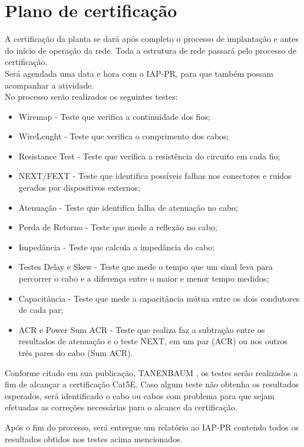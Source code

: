 \documentclass[	DIV=calc,%
							paper=a4,%
							fontsize=12pt,%
							onecolumn]{scrartcl}	 					%
\begin{document}
\section{Plano de certificação}
A certificação da planta se dará após completo o processo de implantação e antes do início de operação da rede. Toda a estrutura de rede passará pelo processo de certificação.\\
Será agendada uma data e hora com o IAP-PR, para que também possam acompanhar a atividade.\\
No processo serão realizados os seguintes testes:
\begin{itemize}
\vspace{5mm}
\item Wiremap - Teste que verifica a continuidade dos fios;
\item WireLenght - Teste que verifica o comprimento dos cabos;
\item Resistance Test - Teste que verifica a resistência do circuito em cada fio;
\item NEXT/FEXT - Teste que identifica possíveis falhas nos conectores e ruídos gerados por dispositivos externos;
\item Atenuação - Teste que identifica falha de atenuação no cabo;
\item Perda de Retorno - Teste que mede a reflexão no cabo;
\item Impedância - Teste que calcula a impedância do cabo;
\item Testes Delay e Skew - Teste que mede o tempo que um sinal leva para percorrer o cabo e a diferença entre o maior e menor tempo medidos;
\item Capacitância - Teste que mede a capacitância mútua entre os dois condutores de cada par;
\item ACR e Power Sum ACR - Teste que realiza faz a subtração entre os resultados de atenuação e o teste NEXT, em um par (ACR) ou nos outros três pares do cabo (Sum ACR).
\end{itemize}
\par Conforme citado em sua publicação, TANENBAUM \cite{TANENBAUM}, os testes serão realizados a fim de alcançar a certificação Cat5E.
Caso algum teste não obtenha os resultados esperados, será identificado o cabo ou cabos com problema para que sejam efetuadas as correções necessárias para o alcance da certificação.\par
Após o fim do processo, será entregue um relatório ao IAP-PR contendo todos os resultados obtidos nos testes acima mencionados.
\end{document}
